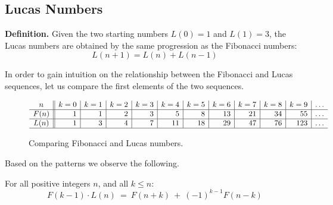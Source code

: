 \subsection{Lucas Numbers} 

%
\textbf{Definition.}
Given the two starting numbers $L(0) = 1$ and $L(1) = 3$, the Lucas numbers are obtained by the same progression as the Fibonacci numbers: 
\[ L(n+1) = L(n)+L(n-1) \]

\medskip

In order to gain intuition on the relationship between the Fibonacci and Lucas sequences, let us compare the first elements of the two sequences.
\begin{figure}[htb]
\[
\begin{array}{c||r|r|r|r|r|r|r|r|r|r|r}
{\displaystyle n } & k=0 & k=1 & k=2 & k=3 & k=4 & k=5 &
k=6 & k=7 & k=8 & k=9 & \ldots \\
\hline
F(n) & 1 & 1 &  2  &  3  &   5  &   8  &  13  &  21  & 34  & 55  & \ldots \\
\hline
L(n) & 1 & 3 &  4 &  7  &  11  &  18  &  29 & 47  & 76  & 123 & \ldots \\
\hline
\end{array}
\] 
\caption{Comparing Fibonacci and Lucas numbers.}
\label{fig:fiboLucas}
\end{figure}


\medskip

Based on the patterns we observe the following.

\begin{prop}
For all positive integers $n$, and all $k \leq n$:
\[ F(k-1) \cdot L(n) \ = \ F(n+k) \ + \ (-1)^{k-1} F(n-k) \]
\end{prop}

